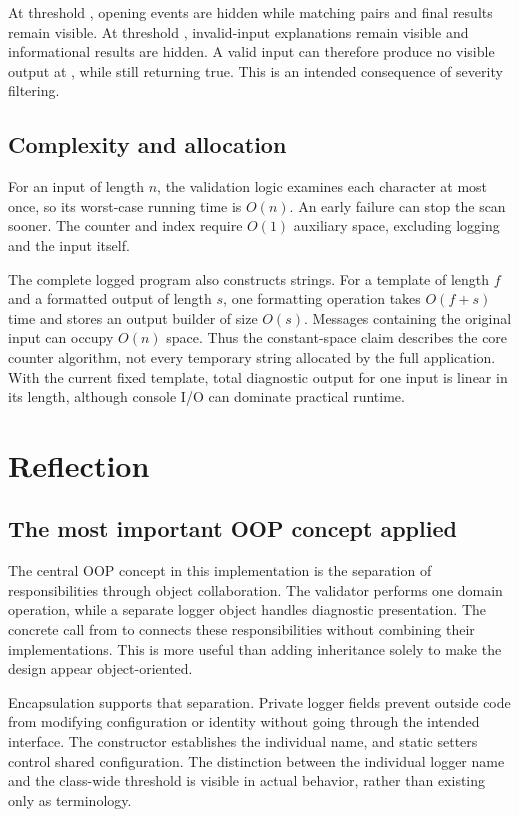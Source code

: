 At threshold , opening events are hidden while matching pairs and final results remain visible. At threshold , invalid-input explanations remain visible and informational results are hidden. A valid input can therefore produce no visible output at , while still returning true. This is an intended consequence of severity filtering.

\subsection{Complexity and allocation}
For an input of length $n$, the validation logic examines each character at most once, so its worst-case running time is $O(n)$. An early failure can stop the scan sooner. The counter and index require $O(1)$ auxiliary space, excluding logging and the input itself.

The complete logged program also constructs strings. For a template of length $f$ and a formatted output of length $s$, one formatting operation takes $O(f+s)$ time and stores an output builder of size $O(s)$. Messages containing the original input can occupy $O(n)$ space. Thus the constant-space claim describes the core counter algorithm, not every temporary string allocated by the full application. With the current fixed template, total diagnostic output for one input is linear in its length, although console I/O can dominate practical runtime.

\section{Reflection}
\subsection{The most important OOP concept applied}
The central OOP concept in this implementation is the separation of responsibilities through object collaboration. The validator performs one domain operation, while a separate logger object handles diagnostic presentation. The concrete call from  to  connects these responsibilities without combining their implementations. This is more useful than adding inheritance solely to make the design appear object-oriented.

Encapsulation supports that separation. Private logger fields prevent outside code from modifying configuration or identity without going through the intended interface. The constructor establishes the individual name, and static setters control shared configuration. The distinction between the individual logger name and the class-wide threshold is visible in actual behavior, rather than existing only as terminology.

